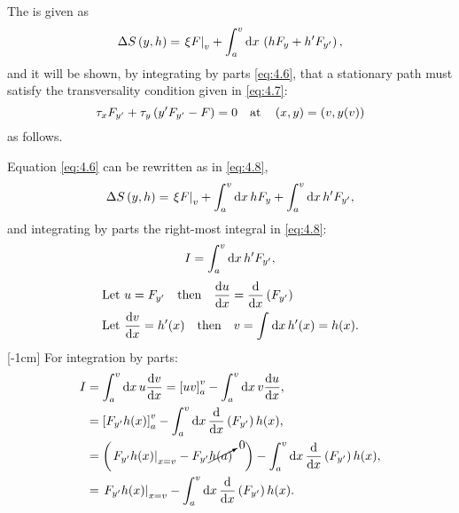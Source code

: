 The \gd is given as
\begin{equation}
	\label{eq:4.6}
	\Delta S\left(y,h\right) = \left. \xi F \right|_v + \int_{a}^{v}\mathrm{d} x\,\left(hF_y + h^\prime F_{y^\prime}\right),
\end{equation}
and it will be shown, by integrating by parts \eqref{eq:4.6}, that a stationary path  must satisfy the transversality condition given in \eqref{eq:4.7}:
\begin{equation}
	\label{eq:4.7}
	\tau_x F_{y^\prime} + \tau_y\left(y^\prime F_{y^\prime} - F\right) = 0 \quad\text{at}\quad\left(x,y\right) = \left(v,y(v)\right)
\end{equation}
as follows.

Equation \eqref{eq:4.6} can be rewritten as in \eqref{eq:4.8},
\begin{equation}
	\label{eq:4.8}
	\Delta S\left(y,h\right) = \left. \xi F \right|_v + \int_{a}^{v}\mathrm{d} x\, hF_y + \int_{a}^{v}\mathrm{d} x\, h^\prime F_{y^\prime},
\end{equation}
and integrating by parts the right-most integral in \eqref{eq:4.8}:
\begin{equation}
\label{eq:4.9}
\begin{split}
	I = \int_{a}^{v}\mathrm{d} x\, h^\prime F_{y^\prime},
\end{split}
\end{equation}
\begin{equation*}
\begin{split}
	&\text{Let } u=F_{y^\prime}\quad\text{then}\quad \frac{\mathrm{d}u}{\mathrm{d}x} = \frac{\mathrm{d}}{\mathrm{d}x}\left(F_{y^\prime}\right)\\
	&\text{Let } \frac{\mathrm{d}v}{\mathrm{d}x} = h^\prime(x) \quad\text{then}\quad v = \int_{}^{}\mathrm{d} x\, h^\prime(x) = h(x).
\end{split}
\end{equation*}
[-1cm]
For integration by parts:
\begin{equation*}
\begin{split}
	I &= \int_{a}^{v}\mathrm{d} x\, u \frac{\mathrm{d}v}{\mathrm{d}x} = \left[uv\right]_a^v - \int_{a}^{v}\mathrm{d} x\, v \frac{\mathrm{d}u}{\mathrm{d}x},\\
	&= \left[F_{y^\prime} h(x)\right]_a^v - \int_{a}^{v}\mathrm{d} x\,\frac{\mathrm{d}}{\mathrm{d}x}\left(F_{y^\prime}\right) h(x),\\
	&= \left(\left. F_{y^\prime} h(x)\right|_{x=v} - F_{y^\prime} \cancelto{0}{h(a)}\quad\right) - \int_{a}^{v}\mathrm{d} x\,\frac{\mathrm{d}}{\mathrm{d}x}\left(F_{y^\prime}\right) h(x),\\
	&=  \left. F_{y^\prime} h(x)\right|_{x=v}- \int_{a}^{v}\mathrm{d} x\,\frac{\mathrm{d}}{\mathrm{d}x}\left(F_{y^\prime}\right) h(x).
\end{split}
\end{equation*}
